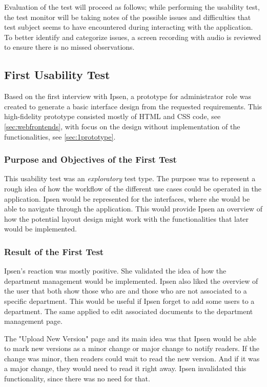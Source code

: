 \documentclass[../../master.tex]{subfiles}
\begin{document}
Evaluation of the test will proceed as follows; while performing the usability test, the test monitor will be taking notes of the possible issues and difficulties that test subject seems to have encountered during interacting with the application.
To better identify and categorize issues, a screen recording with audio is reviewed to ensure there is no missed observations.

\subsection{First Usability Test}\label{firsttest}
Based on the first interview with Ipsen, a prototype for administrator role was created to generate a basic interface design from the requested requirements.
This high-fidelity prototype consisted mostly of HTML and CSS code, see \cref{sec:webfrontends}, with focus on the design without implementation of the functionalities, see \cref{sec:1prototype}.

\subsubsection*{Purpose and Objectives of the First Test}
This usability test was an \textit{exploratory} test type.
The purpose was to represent a rough idea of how the workflow of the different use cases could be operated in the application.
Ipsen would be represented for the interfaces, where she would be able to navigate through the application.
This would provide Ipsen an overview of how the potential layout design might work with the functionalities that later would be implemented.

\subsubsection*{Result of the First Test}
Ipsen's reaction was mostly positive.
She validated the idea of how the department management would be implemented.
Ipsen also liked the overview of the user that both show those who are and those who are not associated to a specific department.
This would be useful if Ipsen forget to add some users to a department.
The same applied to edit associated documents to the department management page.

The "Upload New Version" page and its main idea was that Ipsen would be able to mark new versions as a minor change or major change to notify readers.
If the change was minor, then readers could wait to read the new version.
And if it was a major change, they would need to read it right away.
Ipsen invalidated this functionality, since there was no need for that.
\end{document}
